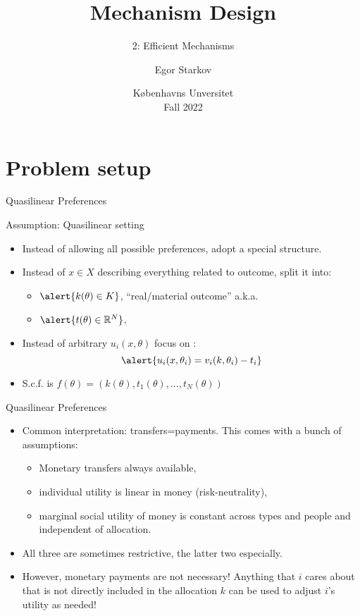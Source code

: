 \documentclass[english,10pt
,aspectratio=169
]{beamer}
\title{Mechanism Design}
\subtitle{2: Efficient Mechanisms}
\author{Egor Starkov}
\date{K{\o}benhavns Unversitet \\
	Fall 2022}
\begin{document}
	\frame[plain]{\titlepage}



\section{Problem setup}

\begin{frame}{Quasilinear Preferences}
	\begin{alertblock}{Assumption: Quasilinear setting}
		\begin{itemize}
			\item Instead of allowing all possible preferences, adopt a special structure.
			\item Instead of $x \in X$ describing everything related to outcome, split it into:
			\begin{itemize}
				\item $\alert{k(\theta) \in K}$, ``real/material outcome'' a.k.a. 
				\item $\alert{t(\theta) \in \mathbb{R}^N}$, 
			\end{itemize}
			\item Instead of arbitrary $u_i(x,\theta)$ focus on :
			$$\alert{ u_i(x,\theta_i) = v_i(k,\theta_i) - t_i }$$
			\vspace{-1em}
			\item S.c.f. is $f(\theta) = \left( k(\theta), t_1(\theta), ..., t_N(\theta) \right)$
		\end{itemize}
	\end{alertblock}
\end{frame}


\begin{frame}{Quasilinear Preferences}
\begin{itemize}
	\item Common interpretation: transfers=payments. This comes with a bunch of assumptions:
	\begin{itemize}
		\item Monetary transfers always available,
		\item individual utility is linear in money (risk-neutrality),
		\item marginal social utility of money is constant across types and people and independent of allocation.
	\end{itemize}
	\item All three are sometimes restrictive, the latter two especially. 
	\item However, monetary payments are not necessary! Anything that $i$ cares about that is not directly included in the allocation $k$ can be used to adjust $i$'s utility as needed!
\end{itemize}
\end{frame}
\end{document}
